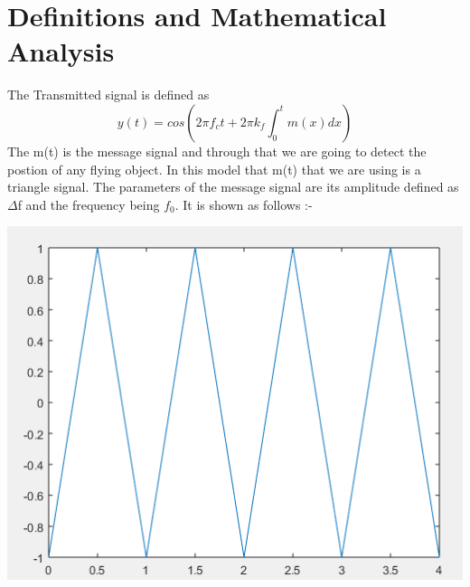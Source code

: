 \documentclass[12pt]{article}
\begin{document}
\section{Definitions and Mathematical Analysis}
\begin{flushleft}
The Transmitted signal is defined as
\[y(t) = cos(2\pi f_ct + 2\pi k_f \int_{0}^{t} m(x) dx)\]
The m(t) is the message signal and through that we are going to detect the postion of any flying object. In this model that m(t) that we are using is a triangle signal. The parameters of the message signal are its amplitude defined as $\Delta$f and the frequency being $f_0$. It is shown as follows :-\\
\begin{center}
\includegraphics[scale = 0.6]{message.PNG}\\[1.0 cm]
\end{center}
\end{flushleft}
\end{document}
